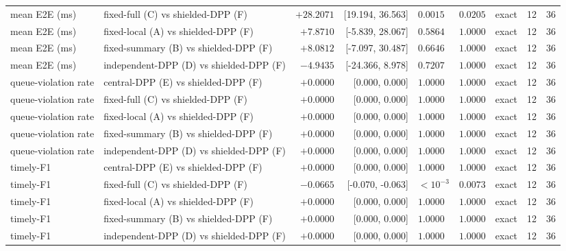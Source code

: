 \begin{table}[t]
\begin{tabular}{llrrlllrr}
mean E2E (ms) & fixed-full (C) vs shielded-DPP (F) & $+28.2071$ & [19.194, 36.563] & $0.0015$ & $0.0205$ & exact & 12 & 36 \\
mean E2E (ms) & fixed-local (A) vs shielded-DPP (F) & $+7.8710$ & [-5.839, 28.067] & $0.5864$ & $1.0000$ & exact & 12 & 36 \\
mean E2E (ms) & fixed-summary (B) vs shielded-DPP (F) & $+8.0812$ & [-7.097, 30.487] & $0.6646$ & $1.0000$ & exact & 12 & 36 \\
mean E2E (ms) & independent-DPP (D) vs shielded-DPP (F) & $-4.9435$ & [-24.366, 8.978] & $0.7207$ & $1.0000$ & exact & 12 & 36 \\
queue-violation rate & central-DPP (E) vs shielded-DPP (F) & $+0.0000$ & [0.000, 0.000] & $1.0000$ & $1.0000$ & exact & 12 & 36 \\
queue-violation rate & fixed-full (C) vs shielded-DPP (F) & $+0.0000$ & [0.000, 0.000] & $1.0000$ & $1.0000$ & exact & 12 & 36 \\
queue-violation rate & fixed-local (A) vs shielded-DPP (F) & $+0.0000$ & [0.000, 0.000] & $1.0000$ & $1.0000$ & exact & 12 & 36 \\
queue-violation rate & fixed-summary (B) vs shielded-DPP (F) & $+0.0000$ & [0.000, 0.000] & $1.0000$ & $1.0000$ & exact & 12 & 36 \\
queue-violation rate & independent-DPP (D) vs shielded-DPP (F) & $+0.0000$ & [0.000, 0.000] & $1.0000$ & $1.0000$ & exact & 12 & 36 \\
timely-F1 & central-DPP (E) vs shielded-DPP (F) & $+0.0000$ & [0.000, 0.000] & $1.0000$ & $1.0000$ & exact & 12 & 36 \\
timely-F1 & fixed-full (C) vs shielded-DPP (F) & $-0.0665$ & [-0.070, -0.063] & $<10^{-3}$ & $0.0073$ & exact & 12 & 36 \\
timely-F1 & fixed-local (A) vs shielded-DPP (F) & $+0.0000$ & [0.000, 0.000] & $1.0000$ & $1.0000$ & exact & 12 & 36 \\
timely-F1 & fixed-summary (B) vs shielded-DPP (F) & $+0.0000$ & [0.000, 0.000] & $1.0000$ & $1.0000$ & exact & 12 & 36 \\
timely-F1 & independent-DPP (D) vs shielded-DPP (F) & $+0.0000$ & [0.000, 0.000] & $1.0000$ & $1.0000$ & exact & 12 & 36 \\
\bottomrule
\end{tabular}
\end{table}
